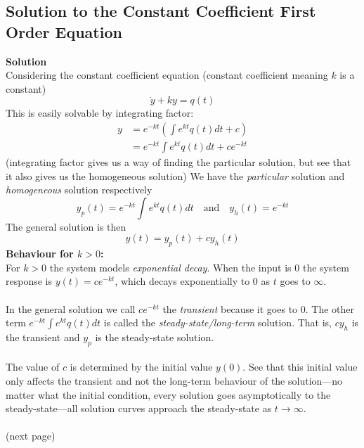 \documentclass{report}
\begin{document}
\subsection{Solution to the Constant Coefficient First Order Equation}
\textbf{Solution}\\
Considering the constant coefficient equation (constant coefficient meaning $k$ is a constant)
\begin{equation*}
\dot{y}+ky=q(t)
\end{equation*}
This is easily solvable by integrating factor:
\begin{align*}
y&=e^{-kt}\left(\int e^{kt}q(t)dt+c\right)\\
&=e^{-kt}\int e^{kt}q(t)dt+ce^{-kt}
\end{align*}
(integrating factor gives us a way of finding the particular solution, but see that it also gives us the 
homogeneous solution) We have the \textit{particular} solution and \textit{homogeneous} solution respectively
\begin{equation*}
y_p(t)=e^{-kt}\int e^{kt}q(t)dt\quad\text{and}\quad
y_h(t)=e^{-kt}
\end{equation*}
The general solution is then
\begin{equation*}
y(t)=y_p(t)+cy_h(t)
\end{equation*}
\textbf{Behaviour for $k>0$:}\\
For $k>0$ the system models \textit{exponential decay}. When the input is 0 the system response is $y(t)=ce^{-kt}$, 
which decays exponentially to 0 as $t$ goes to $\infty$.\\
\vspace{1mm}\\
In the general solution we call $ce^{-kt}$ the \textit{transient} because it goes to 0. The other term 
$e^{-kt}\int e^{kt}q(t)dt$ is called the \textit{steady-state/long-term} solution. That is, $cy_h$ is the transient
and $y_p$ is the steady-state solution.\\
\vspace{1mm}\\
The value of $c$ is determined by the initial value $y(0)$. See that this initial value only affects the transient
and not the long-term behaviour of the solution---no matter what the initial condition, every solution goes
asymptotically to the steady-state---all solution curves approach the steady-state as $t\to\infty$.\\
\vspace{1mm}\\
(next page)
\end{document}
